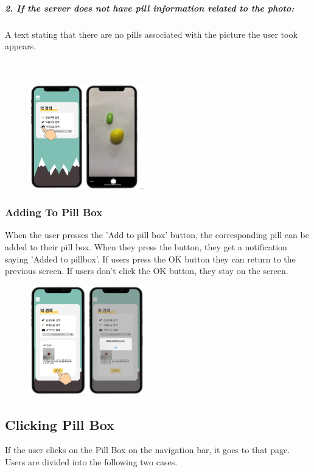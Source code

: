 \documentclass[conference]{IEEEtran}
\begin{document}
\subparagraph{2. If the server does not have pill information related to the photo:}
A text stating that there are no pills associated with the picture the user took appears.\\


\\
\\
\begin{figure}[h!]
\centering
\includegraphics[width=5cm]{final_image_folder/click_search_photo.png}
\caption{}
\label{fig:map}
\end{figure}

\subsubsection{Adding To Pill Box}
When the user presses the 'Add to pill box' button, the corresponding pill can be added to their pill box. When they press the button, they get a notification saying 'Added to pillbox'. If users press the OK button they can return to the previous screen. If users don't click the OK button, they stay on the screen. \\

\begin{figure}[h!]
\centering
\includegraphics[width=5cm]{final_image_folder/click_search_add.png}
\caption{}
\label{fig:map}
\end{figure}

\subsection{Clicking Pill Box}
If the user clicks on the Pill Box on the navigation bar, it goes to that page. Users are divided into the following two cases.\\
\end{document}
